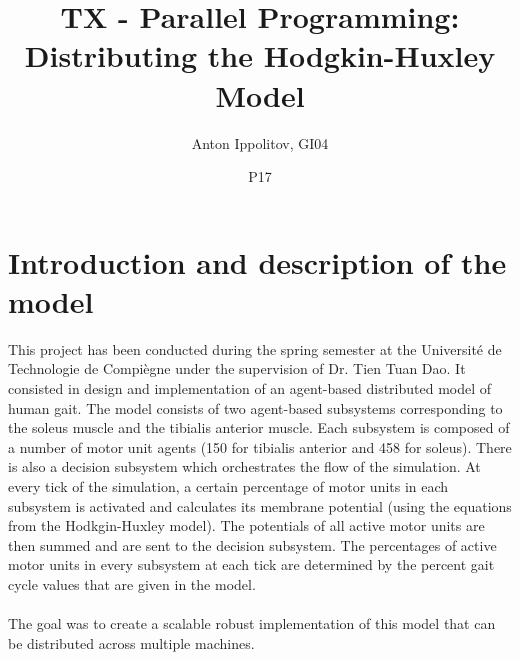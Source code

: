 \documentclass[titlepage]{article}
\begin{document}
\title{TX - Parallel Programming: Distributing the Hodgkin-Huxley Model}
\date{P17}
\author{Anton Ippolitov, GI04}
\maketitle

\tableofcontents
\newpage

\section{Introduction and description of the model}
This project has been conducted during the spring semester at the Universit\'e de Technologie de Compi\`egne under the supervision of Dr. Tien Tuan Dao. It consisted in design and implementation of an agent-based distributed model of human gait. The model consists of two agent-based subsystems corresponding to the soleus muscle and the tibialis anterior muscle. Each subsystem is composed of a number of motor unit agents (150 for tibialis anterior and 458 for soleus). There is also a decision subsystem which orchestrates the flow of the simulation. At every tick of the simulation, a certain percentage of motor units in each subsystem is activated and calculates its membrane potential (using the equations from the Hodkgin-Huxley model). The potentials of all active motor units are then summed and are sent to the decision subsystem. The percentages of active motor units in every subsystem at each tick are determined by the percent gait cycle values that are given in the model. 
\\\\
The goal was to create a scalable robust implementation of this model that can be distributed across multiple machines.
\end{document}
